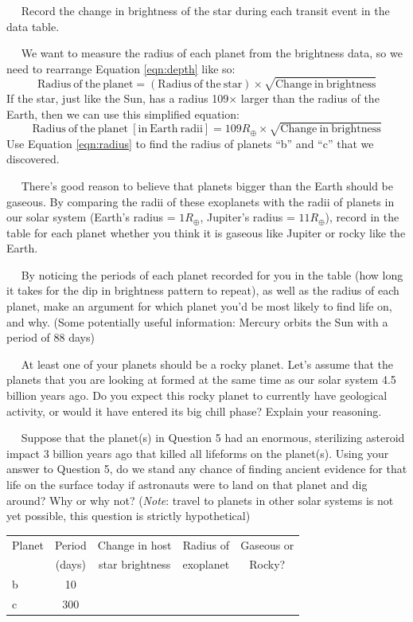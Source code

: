 \documentclass[12pt]{article}
\newcommand{\question}[1]{\vspace{10mm} \noindent {\bf #1)}~~}
\begin{document}
\question{1} Record the change in brightness of the star during each transit event in the data table. 

\question{2} We want to measure the radius of each planet from the brightness data, so we need to rearrange Equation \ref{eqn:depth} like so:
\begin{equation}
\mathrm{Radius~of~the~planet} = \left( \mathrm{Radius~of~the~star} \right) \times \sqrt{\mathrm{Change~in~brightness}}
\end{equation}
If the star, just like the Sun, has a radius 109$\times$ larger than the radius of the Earth, then we can use this simplified equation:
\begin{equation}
\mathrm{Radius~of~the~planet~[in~Earth~radii]} = 109R_\oplus  \times \sqrt{\mathrm{Change~in~brightness}} \label{eqn:radius}
\end{equation}
Use Equation \ref{eqn:radius} to find the radius of planets ``b'' and ``c'' that we discovered. 

\question{3} There's good reason to believe that planets bigger than the Earth should be gaseous. By comparing the radii of these exoplanets with the radii of planets in our solar system (Earth's radius = $1 R_\oplus$, Jupiter's radius = $11 R_\oplus$), record in the table for each planet whether you think it is gaseous like Jupiter or rocky like the Earth.

\question{4} By noticing the periods of each planet recorded for you in the table (how long it takes for the dip in brightness pattern to repeat), as well as the radius of each planet, make an argument for which planet you'd be most likely to find life on, and why. (Some potentially useful information: Mercury orbits the Sun with a period of 88 days)
\vspace{6 cm}

\question{5} At least one of your planets should be a rocky planet. Let's assume that the planets that you are looking at formed at the same time as our solar system 4.5 billion years ago. Do you expect this rocky planet to currently have geological activity, or would it have entered its big chill phase? Explain your reasoning.
\vspace{6 cm}


\question{6} Suppose that the planet(s) in Question 5 had an enormous, sterilizing asteroid impact 3 billion years ago that killed all lifeforms on the planet(s). Using your answer to Question 5, do we stand any chance of finding ancient evidence for that life on the surface today if astronauts were to land on that planet and dig around? Why or why not? ({\it Note}: travel to planets in other solar systems is not yet possible, this question is strictly hypothetical)
\vspace{6 cm}


\vspace{3cm}
\begin{table}[h!]
\centering
\begin{tabular}{|l |c |c| c| c|}
\hline
Planet & Period & Change in host & Radius of & Gaseous or   \\
 & (days) & star brightness  &  exoplanet    & Rocky? \\ \hline
b & 10 & & & \\ \hline
c & 300 & & & \\ \hline
\end{tabular}
\end{table}
\end{document}
